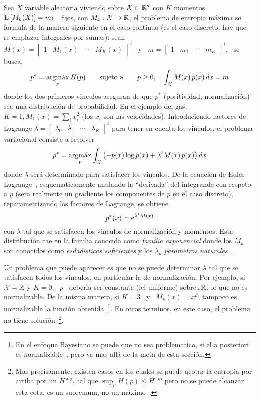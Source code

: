 Sea $X$ variable aleatoria viviendo  sobre $\mathcal{X} \subset \mathbb{R}^d$ con $K$ momentos
\  $\operatorname{E}\left[ M_k(X)  \right]  = m_k$  \ fijos,  con  $M_x: \mathcal{X}  \to \mathbb{R}$,  el
problema  de entropia  m\'axima se  formula de  la manera  siguiente en  el caso
continuo (es el caso discreto, hay que re-emplazar integrales por sumas): sean \
$M(x) = \begin{bmatrix} 1  & M_1(x) & \cdots & M_K(x) \end{bmatrix}^t$  \ y \ $m
= \begin{bmatrix} 1 & m_1 & \cdots & m_K \end{bmatrix}^t$, \ se busca,
%
\[
p^* = \operatorname*{argm\acute{a}x}_p H(p) \qquad \mbox{sujeto a} \qquad p \ge 0, \quad \int_{\mathcal{X}} M(x)
\, p(x) \, dx = m
\]
%
donde   los  dos  primeros   vinculos  aseguran   de  que   $p^*$  (positividad,
normalizaci\'on) sea una distribuci\'on de  probabilidad. En el ejemplo del gas,
$K =  1, M_1(x) = \sum_i  x_i^2$ (los $x_i$ son  las velocidades). Introduciendo
factores de Lagrange $\lambda = \begin{bmatrix} \lambda_0 & \lambda_1 & \cdots &
  \lambda_K  \end{bmatrix}^t$ para  tener en  cuenta los  vinculos,  el problema
variacional   consiste  a   resolver~\cite{GelFom63,  Bru04,   Mil00,  CamMar09,
  CovTho06}
%
\[
p^* = \operatorname*{argm\acute{a}x}_p \int_{\mathcal{X}} \left( - p(x) \log p(x) + \lambda^t M(x) \, p(x) \right)
dx
\]
%
donde  $\lambda$  ser\'a  determinado  para  satisfacer  los  vinculos.   De  la
ecuaci\'on  de Euler-Lagrange~\cite{GelFom63, Bru04},  esquematicamente anulando
la ``derivada''  del integrande con respeto  a $p$ (sera  realmente un gradiente
los componentes  de $p$ en el  caso discreto), reparametrizando  los factores de
Lagrange, se obtiene
%
\[
p^*(x) = \operatorname{e}^{\lambda^t M(x)}
\]
%
con $\lambda$ tal que se  satisfacen los vinculos de normalizaci\'on y momentos.
Esta distribuci\'on  cae en la  familia conocida como {\it  familia exponencial}
donde  los  $M_k$  son  conocidos  como {\it  esdadisticas  suficientes}  y  los
$\lambda_k$  {\it   parametros  naturales}~\cite{Dar35,  Koo36,   And70,  Kay93,
  LehCas98, Rob07}.

Un problema que  puede aparecer es que no se puede  determinar $\lambda$ tal que
se  satisfacen todos  los vinculos,  en particular  la de  normalizaci\'on.  Por
ejemplo, si $\mathcal{X} = \mathbb{R}$ y $K = 0$, \ $p$ \ deberia ser constante (lei uniforme)
sobre\ldots $\mathbb{R}$, lo que no es normalizable. De la misma manera, si $K = 3$ \
y \ $M_k(x)  = x^k$, tampoco es normalizable  la funci\'on obtenida~\footnote{En
  el enfoque Bayesiano  se puede que no sea problematico, si  el a posteriori es
  normalizable~\cite{Rob07}, pero va mas all\'a  de la meta de esta secci\'on.}.
En otros terminos,  en este caso, el problema  no tiene soluci\'on~\footnote{Mas
  precisamente,  existen casos en  los cuales  se puede  acotar la  entropia por
  arriba por un $H^{\sup}$, tal que  $\sup_p H(p) \le H^{\sup}$ pero no se puede
  alcanzar     esta     cota,     \ie      es     un     supremum,     no     un
  m\'aximo~\cite[sec.~12.3]{CovTho06}.}.


